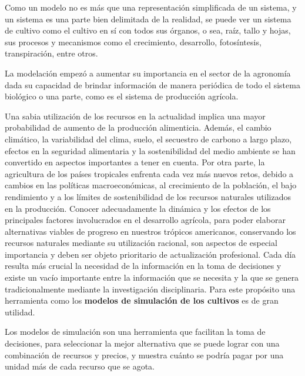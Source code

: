 Como un modelo no es más que una representación simplificada de un sistema, y un sistema es una parte bien delimitada de la realidad, se puede ver un sistema de cultivo como el cultivo en sí con todos sus órganos, o sea, raíz, tallo y hojas, sus procesos y mecanismos como el crecimiento, desarrollo, fotosíntesis, transpiración, entre otros. \parencite{hernandez2009modelos}

La modelación empezó a aumentar su importancia en el sector de la agronomía dada su capacidad de brindar información de manera periódica de todo el sistema biológico o una parte, como es el sistema de producción agrícola. \parencite{guevara2007simulacion}

Una sabia utilización de los recursos en la actualidad implica una mayor probabilidad de aumento de la producción alimenticia. Además, el cambio climático, la variabilidad del clima, suelo, el secuestro de carbono a largo plazo, efectos en la seguridad alimentaria y la sostenibilidad del medio ambiente se han convertido en aspectos importantes a tener en cuenta. Por otra parte, la agricultura de los países tropicales enfrenta cada vez más nuevos retos, debido a cambios en las políticas macroeconómicas, al crecimiento de la población, el bajo rendimiento y a los límites de sostenibilidad de los recursos naturales utilizados en la producción. Conocer adecuadamente la dinámica y los efectos de los principales factores involucrados en el desarrollo agrícola, para poder elaborar alternativas viables de progreso en nuestros trópicos americanos, conservando los recursos naturales mediante su utilización racional, son aspectos de especial importancia y deben ser objeto prioritario de actualización profesional. Cada día resulta más crucial la necesidad de la información en la toma de decisiones y existe un vacío importante entre la información que se necesita y la que se genera tradicionalmente mediante la investigación disciplinaria. Para este propósito una herramienta como los \textbf{modelos de simulación de los cultivos} es de gran utilidad.  \parencite{hernandez2009modelos}

Los modelos de simulación son una herramienta que facilitan la toma de decisiones, para seleccionar la mejor alternativa que se puede lograr con una combinación de recursos y precios, y muestra cuánto se podría pagar por una unidad más de cada recurso que se agota. \parencite{holmann2002uso}\\

